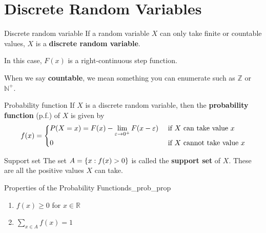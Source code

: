 \section{Discrete Random Variables}
\begin{Definition}{Discrete random variable}{}
    If a random variable $ X $ can only take
    finite or countable values, $ X $
    is a \textbf{discrete random variable}.
\end{Definition}
In this case, $ F(x) $ is a right-continuous
step function.
\begin{Remark}{}{}
    When we say \textbf{countable}, we mean
    something you can enumerate such as $ \mathbb{Z} $ or
    $ \mathbb{N}^+ $.
\end{Remark}

\begin{Definition}{Probability function}{}
    If $ X $ is a discrete random variable,
    then the \textbf{probability function} (p.f.) of $ X $ is given by
    \[ f(x)=
        \begin{dcases}
            P(X=x)=
            F(x)-\lim\limits_{{\varepsilon} \to {0^+}}
            F(x-\varepsilon) & \text{ if } X\text{ can take value }x    \\
            0                & \text{ if } X\text{ cannot take value }x
        \end{dcases} \]
\end{Definition}

\begin{Definition}{Support set}{}
    The set $ A=\{x:f(x)>0\} $ is called the \textbf{support set}
    of $ X $. These are all the positive values $ X $ can take.
\end{Definition}

\begin{Proposition}{Properties of the Probability Function}{ds_prob_prop}
    \begin{enumerate}[label=(\arabic*)]
        \item $ f(x)\geqslant 0 $ for $ x\in\mathbb{R} $
        \item $ \sum\limits_{x\in A}f(x)=1 $
    \end{enumerate}
\end{Proposition}

